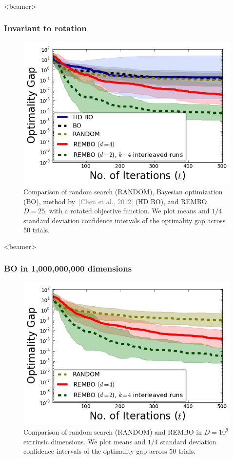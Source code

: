 \documentclass[grey]{beamer}
\begin{document}
 \begin{frame}<beamer>
  \frametitle{Invariant to rotation}
  \begin{figure}
   \includegraphics[width=0.6\columnwidth]{../paper/figures/branin_dis_rot.png}
   \caption{Comparison of random search (RANDOM), Bayesian optimization (BO),
     method by~\textcolor{gray}{[Chen et al., 2012]} (HD BO), and REMBO.
     $D=25$, with a rotated objective function. We plot means and $1/4$ 
     standard deviation confidence intervals of the optimality gap across 50 trials.}
   \label{fig:standard}
  \end{figure}
 \end{frame}

 
 
 
 \begin{frame}<beamer>
  \frametitle{BO in 1,000,000,000 dimensions}
  \begin{figure}
   \includegraphics[width=0.6\columnwidth]{../paper/figures/branin_dis_1b.png}
   \caption{Comparison of random search (RANDOM) and REMBO
     in $D=10^9$ extrinsic dimensions. 
     We plot means and $1/4$ standard deviation confidence intervals of the optimality gap across $50$ trials.}
   \label{fig:standard}
  \end{figure}
 \end{frame}
 
\end{document}

